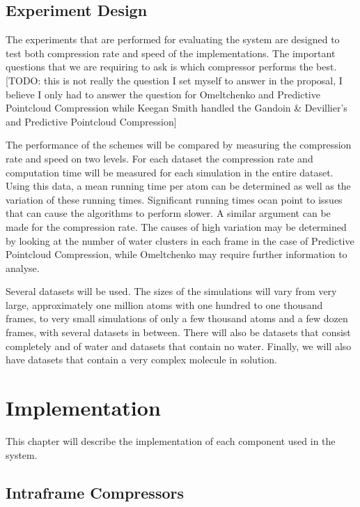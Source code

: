 \documentclass[a4paper,11pt]{report}
\begin{document}
\section{Experiment Design}

The experiments that are performed for evaluating the system are designed to test both compression rate and speed of the implementations. The important questions that we are requiring to ask is which compressor performs the best. [TODO: this is not really the question I set myself to answer in the proposal, I believe I only had to answer the question for Omeltchenko and Predictive Pointcloud Compression while Keegan Smith handled the Gandoin \& Devillier's and Predictive Pointcloud Compression]

The performance of the schemes will be compared by measuring the compression rate and speed on two levels. For each dataset the compression rate and computation time will be measured for each simulation in the entire dataset. Using this data, a mean running time per atom can be determined as well as the variation of these running times. Significant running times ocan point to issues that can cause the algorithms to perform slower. A similar argument can be made for the compression rate. The causes of high variation may be determined by looking at the number of water clusters in each frame in the case of Predictive Pointcloud Compression, while Omeltchenko may require further information to analyse.

Several datasets will be used. The sizes of the simulations will vary from very large, approximately one million atoms with one hundred to one thousand frames, to very small simulations of only a few thousand atoms and a few dozen frames, with several datasets in between. There will also be datasets that consist completely and of water and datasets that contain no water. Finally, we will also have datasets that contain a very complex molecule in solution.

\chapter{Implementation}

This chapter will describe the implementation of each component used in the system.

\section{Intraframe Compressors}
\end{document}
